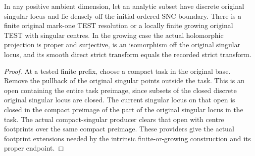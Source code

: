 \begin{theorem}
\label{hir:g8-discrete-original-singular-history}
\leanok
In any positive ambient dimension, let an analytic subset have
discrete original singular locus and lie densely off the initial
ordered SNC boundary. There is a finite original mark-one TEST
resolution or a locally finite growing original TEST with
singular centres. In the growing case the actual holomorphic
projection is proper and surjective, is an isomorphism off the
original singular locus, and its smooth direct strict transform
equals the recorded strict transform.
\end{theorem}
\begin{proof}
At a tested finite prefix, choose a compact task in the original
base. Remove the pullback of the original singular points outside
the task. This is an open containing the entire task preimage,
since subsets of the closed discrete original singular locus are
closed. The current singular locus on that open is closed in the
compact preimage of the part of the original singular locus in the
task. The actual compact-singular producer clears that open with
centre footprints over the same compact preimage. These providers
give the actual footprint extensions needed by the intrinsic
finite-or-growing construction and its proper endpoint.
\end{proof}

